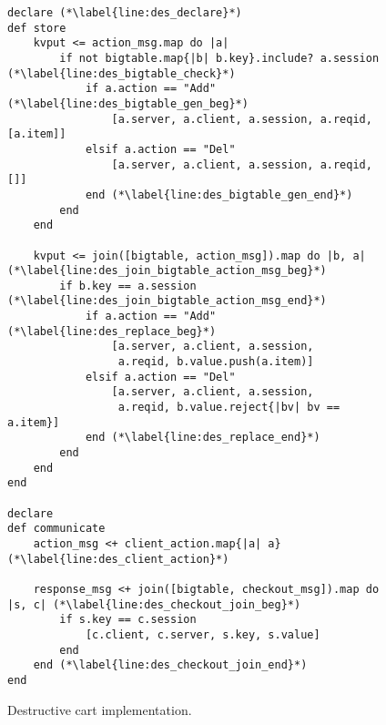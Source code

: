 \begin{comment}
\jmh{Alternative to lines 5--9 is to insert the following rule.  It ``preserves'' the action items that have adds but no deletes ... i.e. the other branch of the left-outer-join.  I think this is easier to explain.}  \jmh{regardless of what you decide, be sure to explain all lines of the program!}
\begin{scriptsize}
\begin{verbatim}
	status <= join(action_cnt, checkout).map do |a, c|
	  if a.action == "Add" and not
	        action_cnt.map{|d| d.id if d.action == "Del" and a.id}.include? a.id
	     [a.session, a.item, a.cnt]
	  end
	end
\end{verbatim}	
\end{scriptsize}
\end{comment}

\begin{figure}[t]
\begin{scriptsize}
\begin{lstlisting}
declare (*\label{line:des_declare}*)
def store
	kvput <= action_msg.map do |a|
		if not bigtable.map{|b| b.key}.include? a.session (*\label{line:des_bigtable_check}*)
			if a.action == "Add" (*\label{line:des_bigtable_gen_beg}*)
				[a.server, a.client, a.session, a.reqid, [a.item]]
			elsif a.action == "Del"
				[a.server, a.client, a.session, a.reqid, []]
			end (*\label{line:des_bigtable_gen_end}*)
		end
	end  

	kvput <= join([bigtable, action_msg]).map do |b, a| (*\label{line:des_join_bigtable_action_msg_beg}*)
		if b.key == a.session (*\label{line:des_join_bigtable_action_msg_end}*)
			if a.action == "Add" (*\label{line:des_replace_beg}*)
				[a.server, a.client, a.session,
				 a.reqid, b.value.push(a.item)]
			elsif a.action == "Del"
				[a.server, a.client, a.session,
				 a.reqid, b.value.reject{|bv| bv == a.item}]
			end (*\label{line:des_replace_end}*)
		end
	end
end

declare
def communicate
	action_msg <+ client_action.map{|a| a} (*\label{line:des_client_action}*)

	response_msg <+ join([bigtable, checkout_msg]).map do |s, c| (*\label{line:des_checkout_join_beg}*)
		if s.key == c.session
			[c.client, c.server, s.key, s.value]
		end
	end (*\label{line:des_checkout_join_end}*)
end
\end{lstlisting}
\vspace{-10pt}
\caption{Destructive cart implementation.}
\label{fig:pdg-destructive}
\vspace{-2pt}
\end{scriptsize}
\end{figure}
